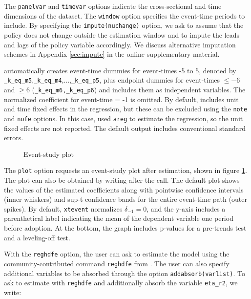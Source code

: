 \documentclass[12pt]{article}
\begin{document}
The \texttt{panelvar} and \texttt{timevar} options indicate the cross-sectional and time dimensions of the dataset.
The \texttt{window} option specifies the event-time periods to include.
By specifying the \texttt{impute(nuchange)} option, we ask \xtevent to assume that the policy does not change outside the estimation window and to impute the leads and lags of the policy variable accordingly.
We discuss alternative imputation schemes in Appendix \ref{sec:impute} in the online supplementary material.

\xtevent automatically creates event-time dummies for event-times -5 to 5, denoted by \texttt{\_k\_eq\_m5},\texttt{\_k\_eq\_m4},...,\texttt{\_k\_eq\_p5}, plus endpoint dummies for event-times $\leq -6$ and $\geq 6$ (\texttt{\_k\_eq\_m6,\_k\_eq\_p6}) and includes them as independent variables.
The normalized coefficient for event-time = -1 is omitted.
By default, \xtevent includes unit and time fixed effects in the regression, but these can be excluded using the \texttt{note} and \texttt{nofe} options.
In this case, \xtevent used \texttt{areg} to estimate the regression, so the unit fixed effects are not reported.
The default output includes conventional standard errors.

\begin{figure}[h!]
	\begin{center}
	\end{center}
	\caption{Event-study plot}
	\label{fig:graph_from_plot_option}
\end{figure}

The \texttt{plot} option requests an event-study plot after estimation, shown in figure \ref{fig:graph_from_plot_option}.
The plot can also be obtained by writing \xteventplot after the \xtevent call.
The default plot shows the values of the estimated coefficients along with pointwise confidence intervals (inner whiskers) and sup-t confidence bands for the entire event-time path (outer spikes).
By default, \texttt{xtevent} normalizes $\delta_{-1}=0$, and the y-axis includes a parenthetical label indicating the mean of the dependent variable one period before adoption.
At the bottom, the graph includes p-values for a pre-trends test and a leveling-off test.

With the \texttt{reghdfe} option, the user can ask \xtevent to estimate the model using the community-contributed command \texttt{reghdfe} from \cite{Correia2017:HDFE}.
The user can also specify additional variables to be absorbed through the option \texttt{addabsorb(varlist)}.
To ask \xtevent to estimate with \texttt{reghdfe} and additionally absorb the variable \texttt{eta\_r2}, we write:
\end{document}
